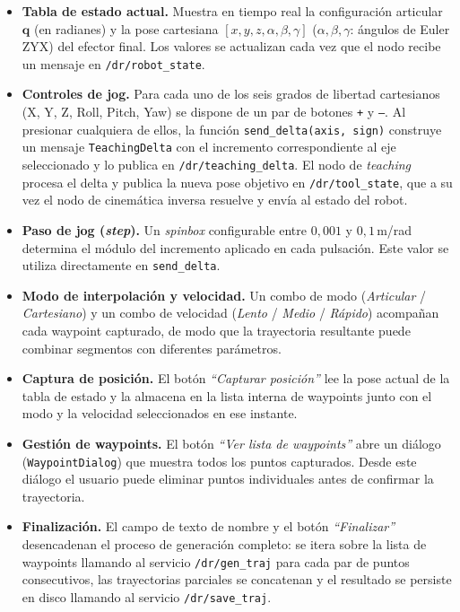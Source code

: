 \documentclass{article}
\begin{document}
\begin{itemize}
    \item \textbf{Tabla de estado actual.} Muestra en tiempo real la configuración articular $\mathbf{q}$ (en radianes) y la pose cartesiana $[x,y,z,\alpha,\beta,\gamma]$ ($\alpha, \beta, \gamma$: ángulos de Euler ZYX) del efector final. Los valores se actualizan cada vez que el nodo recibe un mensaje en \texttt{/dr/robot\_state}.

    \item \textbf{Controles de jog.} Para cada uno de los seis grados de libertad cartesianos (X, Y, Z, Roll, Pitch, Yaw) se dispone de un par de botones \texttt{+} y \texttt{--}. Al presionar cualquiera de ellos, la función \texttt{send\_delta(axis, sign)} construye un mensaje \texttt{TeachingDelta} con el incremento correspondiente al eje seleccionado y lo publica en \texttt{/dr/teaching\_delta}. El nodo de \textit{teaching} procesa el delta y publica la nueva pose objetivo en \texttt{/dr/tool\_state}, que a su vez el nodo de cinemática inversa resuelve y envía al estado del robot.

    \item \textbf{Paso de jog (\textit{step}).} Un \textit{spinbox} configurable entre $0{,}001$ y $0{,}1$\,m/rad determina el módulo del incremento aplicado en cada pulsación. Este valor se utiliza directamente en \texttt{send\_delta}.

    \item \textbf{Modo de interpolación y velocidad.} Un combo de modo (\textit{Articular} / \textit{Cartesiano}) y un combo de velocidad (\textit{Lento} / \textit{Medio} / \textit{Rápido}) acompañan cada waypoint capturado, de modo que la trayectoria resultante puede combinar segmentos con diferentes parámetros.

    \item \textbf{Captura de posición.} El botón \textit{``Capturar posición''} lee la pose actual de la tabla de estado y la almacena en la lista interna de waypoints junto con el modo y la velocidad seleccionados en ese instante.

    \item \textbf{Gestión de waypoints.} El botón \textit{``Ver lista de waypoints''} abre un diálogo (\texttt{WaypointDialog}) que muestra todos los puntos capturados. Desde este diálogo el usuario puede eliminar puntos individuales antes de confirmar la trayectoria.

    \item \textbf{Finalización.} El campo de texto de nombre y el botón \textit{``Finalizar''} desencadenan el proceso de generación completo: se itera sobre la lista de waypoints llamando al servicio \texttt{/dr/gen\_traj} para cada par de puntos consecutivos, las trayectorias parciales se concatenan y el resultado se persiste en disco llamando al servicio \texttt{/dr/save\_traj}.
\end{itemize}
\end{document}
